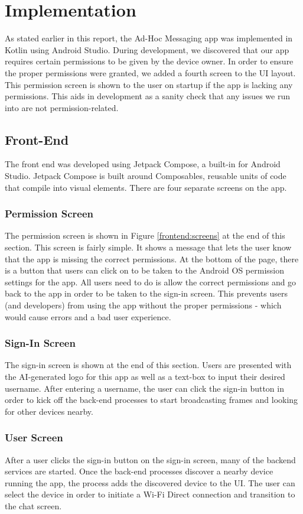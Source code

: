 \documentclass[10pt]{article}
\begin{document}
\section{Implementation}
As stated earlier in this report, the Ad-Hoc Messaging app was implemented in Kotlin using Android Studio. During development, we discovered that our app requires certain permissions to be given by the device owner. In order to ensure the proper permissions were granted, we added a fourth screen to the UI layout. This permission screen is shown to the user on startup if the app is lacking any permissions. This aids in development as a sanity check that any issues we run into are not permission-related.
\subsection{Front-End}
The front end was developed using Jetpack Compose, a built-in for Android Studio. Jetpack Compose is built around Composables, reusable units of code that compile into visual elements.
There are four separate screens on the app. 
\subsubsection{Permission Screen}
The permission screen is shown in Figure \ref{frontend:screens} at the end of this section. This screen is fairly simple. It shows a message that lets the user know that the app is missing the correct permissions. At the bottom of the page, there is a button that users can click on to be taken to the Android OS permission settings for the app. All users need to do is allow the correct permissions and go back to the app in order to be taken to the sign-in screen. This prevents users (and developers) from using the app without the proper permissions - which would cause errors and a bad user experience.
\subsubsection{Sign-In Screen}
The sign-in screen is shown at the end of this section. Users are presented with the AI-generated logo for this app as well as a text-box to input their desired username. After entering a username, the user can click the sign-in button in order to kick off the back-end processes to start broadcasting frames and looking for other devices nearby.
\subsubsection{User Screen}
After a user clicks the sign-in button on the sign-in screen, many of the backend services are started. Once the back-end processes discover a nearby device running the app, the process adds the discovered device to the UI. The user can select the device in order to initiate a Wi-Fi Direct connection and transition to the chat screen.
\end{document}
